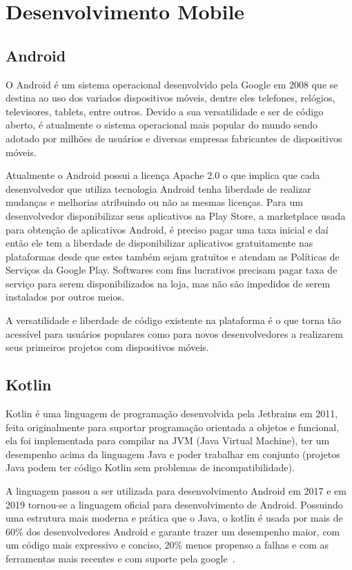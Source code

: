 \section{Desenvolvimento Mobile}\label{sec:desenvolvimento-mobile}

\subsection{Android}\label{subsec:android}

O Android é um sistema operacional desenvolvido pela Google em 2008 que se destina ao uso dos variados dispositivos móveis, dentre eles telefones, relógios, televisores, tablets, entre outros.
Devido a sua versatilidade e ser de código aberto, é atualmente o sistema operacional mais popular do mundo sendo adotado por milhões de usuários e diversas empresas fabricantes de dispositivos móveis.

Atualmente o Android possui a licença Apache 2.0 o que implica que cada desenvolvedor que utiliza tecnologia Android tenha liberdade de realizar mudanças e melhorias atribuindo ou não as mesmas licenças.
Para um desenvolvedor disponibilizar seus aplicativos na Play Store, a marketplace usada para obtenção de aplicativos Android, é preciso pagar uma taxa inicial e daí então ele tem a liberdade de disponibilizar aplicativos gratuitamente nas plataformas desde que estes também sejam gratuitos e atendam as Políticas de Serviços da Google Play.
Softwares com fins lucrativos precisam pagar taxa de serviço para serem disponibilizados na loja, mas não são impedidos de serem instalados por outros meios.

A versatilidade e liberdade de código existente na plataforma é o que torna tão acessível para usuários populares como para novos desenvolvedores a realizarem seus primeiros projetos com dispositivos móveis.

\subsection{Kotlin}\label{subsec:kotlin}

Kotlin é uma linguagem de programação desenvolvida pela Jetbrains em 2011, feita originalmente para suportar programação orientada a objetos e funcional, ela foi implementada para compilar na JVM (Java Virtual Machine), ter um desempenho acima da linguagem Java e poder trabalhar em conjunto (projetos Java podem ter código Kotlin sem problemas de incompatibilidade).

A linguagem passou a ser utilizada para desenvolvimento Android em 2017 e em 2019 tornou-se a linguagem oficial para desenvolvimento de Android.
Possuindo uma estrutura mais moderna e prática que o Java, o kotlin é usada por mais de 60\% dos desenvolvedores Android e garante trazer um desempenho maior, com um código mais expressivo e conciso, 20\% menos propenso a falhas e com as ferramentas mais recentes e com suporte pela google~\cite{android}.

